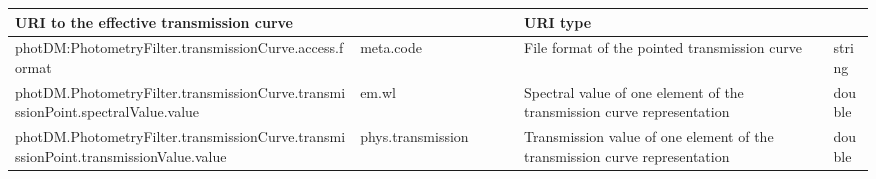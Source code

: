 \documentclass[11pt,a4paper]{ivoa}
\begin{document}
\begin{appendices}
\begin{table}[H]
\begin{adjustbox}{angle=90}
\begin{tabular}{p{7in}p{0.87in}p{0.91in}p{0.4in}p{0.25in}}
\multicolumn{1}{p{0.91in}}{{\fontsize{8pt}{8pt}\selectfont URI to the 
effective transmission curve}} &
\multicolumn{1}{p{0.74in}}{} &
\multicolumn{1}{p{0.35in}}{{\fontsize{8pt}{8pt}\selectfont URI type}} \\
\hline
\multicolumn{1}{p{5in}}{{\fontsize{8pt}{8pt}
\selectfont photDM:PhotometryFilter.transmissionCurve.access.format}} &
\multicolumn{1}{p{0.87in}}{{\fontsize{8pt}{8pt}\selectfont meta.code}} &
\multicolumn{1}{p{0.91in}}{{\fontsize{8pt}{8pt}\selectfont File format of the pointed transmission curve}} &
\multicolumn{1}{p{0.74in}}{} &
\multicolumn{1}{p{0.35in}}{{\fontsize{8pt}{8pt}\selectfont string}} \\
\hline
\multicolumn{1}{p{5in}}{{\fontsize{8pt}{8pt}
\selectfont photDM.PhotometryFilter.transmissionCurve.transmissionPoint.spectralValue.value}} &
\multicolumn{1}{p{0.87in}}{{\fontsize{8pt}{8pt}\selectfont em.wl}} &
\multicolumn{1}{p{0.91in}}{{\fontsize{8pt}{8pt}\selectfont Spectral value 
of one element of the transmission curve representation}} &
\multicolumn{1}{p{0.74in}}{} &
\multicolumn{1}{p{0.35in}}{{\fontsize{8pt}{8pt}\selectfont double}} \\
\hline
\multicolumn{1}{p{5in}}{{\fontsize{8pt}{8pt}
\selectfont photDM.PhotometryFilter.transmissionCurve.transmissionPoint.transmissionValue.value}} &
\multicolumn{1}{p{0.87in}}{{\fontsize{8pt}{8pt}
\selectfont phys.transmission\ \ \ \ \ \ \ \ \ \ \ \ \ \ \ \ \ \ \  }} &
\multicolumn{1}{p{0.91in}}{{\fontsize{8pt}{8pt}\selectfont Transmission value of 
one element of the transmission curve representation}} &
\multicolumn{1}{p{0.74in}}{} &
\multicolumn{1}{p{0.35in}}{{\fontsize{8pt}{8pt}\selectfont double}} \\
\hline

\end{tabular}
\end{adjustbox}
 \end{table}





\newpage




\end{appendices}
\end{document}
